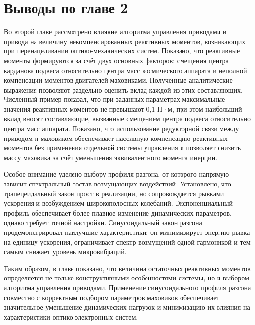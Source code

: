 \section*{Выводы по главе 2}
Во второй главе рассмотрено влияние алгоритма управления приводами и привода на величину некомпенсированных реактивных моментов, возникающих при перенацеливании оптико-механических систем. Показано, что реактивные моменты формируются за счёт двух основных факторов: смещения центра карданова подвеса относительно центра масс космического аппарата и неполной компенсации моментов двигателей маховиками. Полученные аналитические выражения позволяют раздельно оценить вклад каждой из этих составляющих. Численный пример показал, что при заданных параметрах максимальные значения реактивных моментов не превышают 0,1 Н·м, при этом наибольший вклад вносят составляющие, вызванные смещением центра подвеса относительно центра масс аппарата. Показано, что использование редукторной связи между приводом и маховиком обеспечивает пассивную компенсацию реактивных моментов без применения отдельной системы управления и позволяет снизить массу маховика за счёт уменьшения эквивалентного момента инерции.

Особое внимание уделено выбору профиля разгона, от которого напрямую зависит спектральный состав возмущающих воздействий. Установлено, что трапецеидальный закон прост в реализации, но сопровождается рывками ускорения и возбуждением широкополосных колебаний. Экспоненциальный профиль обеспечивает более плавное изменение динамических параметров, однако требует точной настройки. Синусоидальный закон разгона продемонстрировал наилучшие характеристики: он минимизирует энергию рывка на единицу ускорения, ограничивает спектр возмущений одной гармоникой и тем самым снижает уровень микровибраций.

Таким образом, в главе показано, что величина остаточных реактивных моментов определяется не только конструктивными особенностями системы, но и выбором алгоритма управления приводами. Применение синусоидального профиля разгона совместно с корректным подбором параметров маховиков обеспечивает значительное уменьшение динамических нагрузок и минимизацию их влияния на характеристики оптико-электронных систем.





\FloatBarrier
